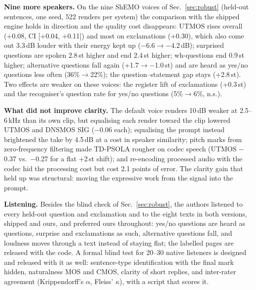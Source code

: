 \documentclass[conference]{IEEEtran}
\newcommand{\RES}[1]{#1}
\begin{document}
\textbf{Nine more speakers.} On the nine ShEMO voices of Sec.~\ref{sec:robust} (held-out sentences, one seed,
522 renders per system) the comparison with the shipped engine holds in direction and the quality cost
disappears: UTMOS rises overall (\RES{+0.08}, CI \RES{[+0.04, +0.11]}) and most on exclamations (\RES{+0.30}),
which also come out \RES{3.3}\,dB louder with their energy kept up (\RES{$-$6.6$\to$$-$4.2}\,dB); surprised
questions are spoken \RES{2.8}\,st higher and end \RES{2.4}\,st higher; wh-questions end \RES{0.9}\,st higher;
alternative questions fall again (\RES{+1.7$\to$$-$1.0}\,st) and are heard as yes/no questions less often
(\RES{36\%$\to$22\%}); the question--statement gap stays (\RES{+2.8}\,st). Two effects are weaker on these
voices: the register lift of exclamations (\RES{+0.3}\,st) and the recogniser's question rate for yes/no
questions (\RES{5\%$\to$6\%}, n.s.).

\textbf{What did not improve clarity.} The default voice renders \RES{10}\,dB weaker at 2.5--6\,kHz than its
own clip, but equalising each render toward the clip lowered UTMOS and DNSMOS SIG (\RES{$-$0.06} each);
equalising the prompt instead brightened the take by \RES{4.5}\,dB at a cost in speaker similarity; pitch marks
from zero-frequency filtering \cite{zff2008} made TD-PSOLA rougher on codec speech (UTMOS \RES{$-$0.37} vs.\
\RES{$-$0.27} for a flat +2\,st shift); and re-encoding processed audio with the codec hid the processing cost
but cost \RES{2.1} points of error. The clarity gain that held up was structural: moving the expressive
work from the signal into the prompt.

\textbf{Listening.} Besides the blind check of Sec.~\ref{sec:robust}, the authors listened to every held-out
question and exclamation and to the eight texts in both versions, shipped and ours, and preferred ours
throughout: yes/no questions are heard as questions, surprise and exclamations as such, alternative questions
fall, and loudness moves through a text instead of staying flat; the labelled pages are released with the
code. A formal blind test for 20--30 native listeners is designed and released with it as well: sentence-type
identification with the final mark hidden, naturalness MOS and CMOS, clarity of short replies, and
inter-rater agreement (Krippendorff's $\alpha$, Fleiss' $\kappa$), with a script that scores it.
\end{document}
